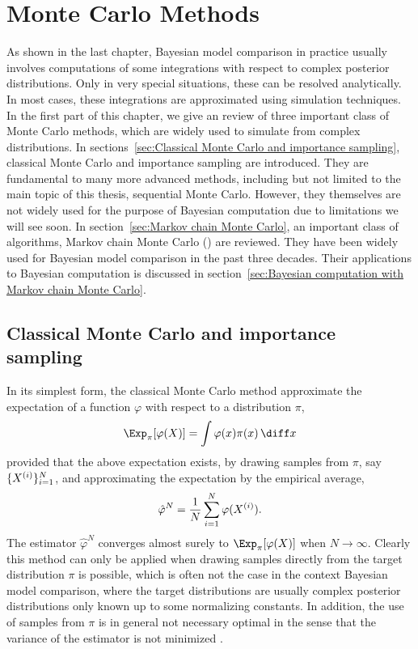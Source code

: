 \chapter{Monte Carlo Methods}
\label{cha:Monte Carlo Methods}

As shown in the last chapter, Bayesian model comparison in practice usually
involves computations of some integrations with respect to complex posterior
distributions. Only in very special situations, these can be resolved
analytically. In most cases, these integrations are approximated using
simulation techniques. In the first part of this chapter, we give an review of
three important class of Monte Carlo methods, which are widely used to
simulate from complex distributions. In sections~\ref{sec:Classical Monte
  Carlo and importance sampling}, classical Monte Carlo and importance
sampling are introduced. They are fundamental to many more advanced methods,
including but not limited to the main topic of this thesis, sequential Monte
Carlo. However, they themselves are not widely used for the purpose of
Bayesian computation due to limitations we will see soon. In
section~\ref{sec:Markov chain Monte Carlo}, an important class of algorithms,
Markov chain Monte Carlo (\mcmc) are reviewed. They have been widely used for
Bayesian model comparison in the past three decades. Their applications to
Bayesian computation is discussed in section~\ref{sec:Bayesian computation
  with Markov chain Monte Carlo}.

\section{Classical Monte Carlo and importance sampling}
\label{sec:Classical Monte Carlo and importance sampling}

In its simplest form, the classical Monte Carlo method approximate the
expectation of a function $\varphi$ with respect to a distribution $\pi$,
\begin{equation}
  \Exp_{\pi}[\varphi(X)] = \int\varphi(x)\pi(x)\intd x
\end{equation}
provided that the above expectation exists, by drawing \iid samples from
$\pi$, say $\{X^{(i)}\}_{i=1}^N$, and approximating the expectation by the
empirical average,
\begin{equation}
  \hat\varphi^N = \frac{1}{N}\sum_{i=1}^N\varphi(X^{(i)}).
  \label{eq:vanilla mc}
\end{equation}
The estimator $\hat\varphi^N$ converges almost surely to
$\Exp_{\pi}[\varphi(X)]$ when $N\to\infty$. Clearly this method can only be
applied when drawing samples directly from the target distribution $\pi$ is
possible, which is often not the case in the context Bayesian model
comparison, where the target distributions are usually complex posterior
distributions only known up to some normalizing constants. In addition, the
use of samples from $\pi$ is in general not necessary optimal in the sense
that the variance of the estimator is not minimized
\cite[][sec.~3.3.2]{Robert:2004tn}.

